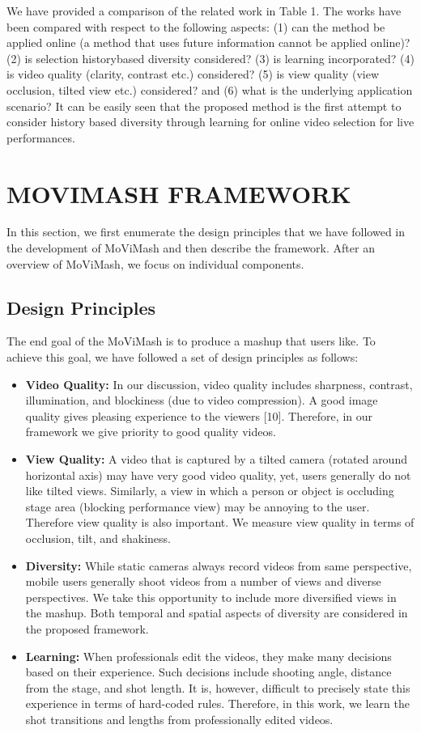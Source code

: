 \documentclass{sig-alternate-05-2015}
\begin{document}
We have provided a comparison of the related work in Table 1.
The works have been compared with respect to the following aspects:
(1) can the method be applied online (a method that uses future
information cannot be applied online)? (2) is selection historybased
diversity considered? (3) is learning incorporated? (4) is
video quality (clarity, contrast etc.) considered? (5) is view quality
(view occlusion, tilted view etc.) considered? and (6) what is the
underlying application scenario? It can be easily seen that the proposed
method is the first attempt to consider history based diversity
through learning for online video selection for live performances.

\section{MOVIMASH FRAMEWORK}
In this section, we first enumerate the design principles that we
have followed in the development of MoViMash and then describe
the framework. After an overview of MoViMash, we focus on individual
components.

\subsection{Design Principles}
The end goal of the MoViMash is to produce a mashup that users
like. To achieve this goal, we have followed a set of design principles
as follows:

\begin{itemize}
\item \textbf{Video Quality:}
In our discussion, video quality includes
sharpness, contrast, illumination, and blockiness (due to video
compression). A good image quality gives pleasing experience
to the viewers [10]. Therefore, in our framework we
give priority to good quality videos.
\item \textbf{View Quality:}
A video that is captured by a tilted camera
(rotated around horizontal axis) may have very good video
quality, yet, users generally do not like tilted views. Similarly,
a view in which a person or object is occluding stage
area (blocking performance view) may be annoying to the user. Therefore view quality is also important. We measure
view quality in terms of occlusion, tilt, and shakiness.
\item \textbf{Diversity:}
While static cameras always record videos from
same perspective, mobile users generally shoot videos from
a number of views and diverse perspectives. We take this
opportunity to include more diversified views in the mashup.
Both temporal and spatial aspects of diversity are considered
in the proposed framework.
\item \textbf{Learning:}
When professionals edit the videos, they make
many decisions based on their experience. Such decisions
include shooting angle, distance from the stage, and shot
length. It is, however, difficult to precisely state this experience
in terms of hard-coded rules. Therefore, in this work,
we learn the shot transitions and lengths from professionally
edited videos.
\end{itemize}
\end{document}
